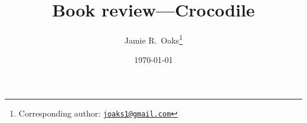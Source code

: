 \documentclass[letterpaper,12pt]{article}
\title{Book review---Crocodile}
\author[1]{Jamie R.\ Oaks\thanks{Corresponding author: \href{mailto:joaks1@gmail.com}{\tt joaks1@gmail.com}}}
\affil[1]{Department of Biology, University of Washington, Seattle, Washington 98195}
\date{\today}
\begin{document}
\maketitle

\newpage
\doublespacing



\end{document}
